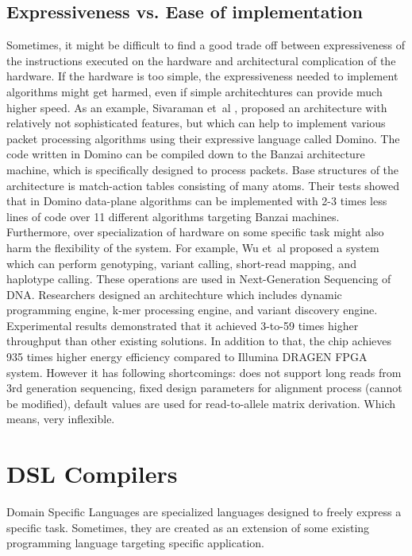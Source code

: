 \documentclass[conference]{IEEEtran}
\begin{document}
\subsection{Expressiveness vs. Ease of implementation}
Sometimes, it might be difficult to find a good trade off between expressiveness of the instructions executed on the hardware and architectural complication of the hardware. If the hardware is too simple, the expressiveness needed to implement algorithms might get harmed, even if simple architechtures can provide much higher speed. As an example, Sivaraman et~al \cite{ref13}, proposed an architecture with relatively not sophisticated features, but which can help to implement various packet processing algorithms using their expressive language called Domino. The code written in Domino can be compiled down to the Banzai architecture machine, which is specifically designed to process packets. Base structures of the architecture is match-action tables consisting of many atoms. Their tests showed that in Domino data-plane algorithms can be implemented with 2-3 times less lines of code over 11 different algorithms targeting Banzai machines.    
Furthermore, over specialization of hardware on some specific task might also harm the flexibility of the system. For example, Wu et~al \cite{ref10} proposed a system which can perform genotyping, variant calling, short-read mapping, and haplotype calling. These operations are used in Next-Generation Sequencing of DNA. Researchers designed an architechture which includes dynamic programming engine, k-mer processing engine, and variant discovery engine. Experimental results demonstrated that it achieved 3-to-59 times higher throughput than other existing solutions. In addition to that, the chip achieves 935 times higher energy efficiency compared to Illumina DRAGEN FPGA system. However it has following shortcomings: does not support long reads from 3rd generation sequencing, fixed design parameters for alignment process (cannot be modified), default values are used for read-to-allele matrix derivation. Which means, very inflexible.    

\section{DSL Compilers}
Domain Specific Languages are specialized languages designed to freely express a specific task. Sometimes, they are created as an extension of some existing programming language targeting specific application. 
\end{document}
